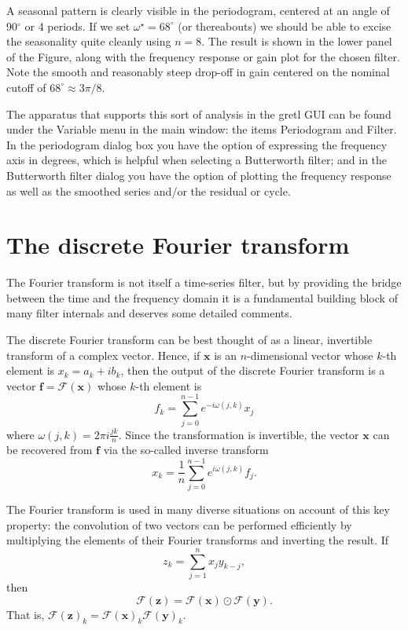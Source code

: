 A seasonal pattern is clearly visible in the periodogram, centered at
an angle of 90$^{\circ}$ or 4 periods. If we set $\omega^{\star} =
68^{\circ}$ (or thereabouts) we should be able to excise the
seasonality quite cleanly using $n=8$.  The result is shown in the
lower panel of the Figure, along with the frequency response or gain
plot for the chosen filter. Note the smooth and reasonably steep
drop-off in gain centered on the nominal cutoff of $68^{\circ} \approx
3\pi/8$.

The apparatus that supports this sort of analysis in the gretl
GUI can be found under the \textsf{Variable} menu in the main window:
the items \textsf{Periodogram} and \textsf{Filter}. In the periodogram
dialog box you have the option of expressing the frequency axis in
degrees, which is helpful when selecting a Butterworth filter; and in
the Butterworth filter dialog you have the option of plotting the
frequency response as well as the smoothed series and/or the residual
or cycle.

\section{The discrete Fourier transform}
\label{sec:genr-fft} %

The Fourier transform is not itself a time-series filter, but by providing
the bridge between the time and the frequency domain it is a fundamental
building block of many filter internals and deserves some detailed
comments.

The discrete Fourier transform can be best thought of as a linear,
invertible transform of a complex vector. Hence, if $\mathbf{x}$ is an
$n$-dimensional vector whose $k$-th element is $x_k = a_k + i b_k$,
then the output of the discrete Fourier transform is a vector
$\mathbf{f} = \mathcal{F}(\mathbf{x})$ whose $k$-th element is
\[
  f_k = \sum_{j=0}^{n-1} e^{-i \omega(j,k) } x_j
\]
where $\omega(j,k) = 2 \pi i \frac{j k}{n}$. Since the transformation
is invertible, the vector $\mathbf{x}$ can be recovered from
$\mathbf{f}$ via the so-called inverse transform
\[
  x_k = \frac{1}{n} \sum_{j=0}^{n-1} e^{i \omega(j,k) } f_j .
\]

The Fourier transform is used in many diverse situations
on account of this key property: the convolution of two vectors can be
performed efficiently by multiplying the elements of their Fourier
transforms and inverting the result.  If
\[
  z_k = \sum_{j=1}^n x_j y_{k-j} ,
\]
then
\[
  \mathcal{F}(\mathbf{z}) = \mathcal{F}(\mathbf{x}) \odot
  \mathcal{F}(\mathbf{y}) .
\]
That is, $\mathcal{F}(\mathbf{z})_k = \mathcal{F}(\mathbf{x})_k
\mathcal{F}(\mathbf{y})_k$.

